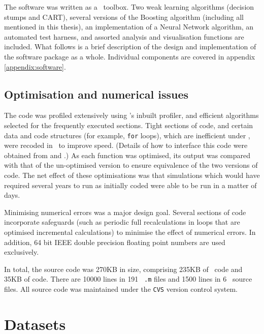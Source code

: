 The software was written as a \MATLAB\ toolbox.  Two weak learning
algorithms (decision stumps and CART), several versions of the
Boosting algorithm (including all mentioned in this thesis), an
implementation of a Neural Network algorithm, an automated test
harness, and assorted analysis and visualisation functions are
included.  What follows is a brief description of the design and
implementation of the software package as a whole.  Individual
components are covered in appendix \ref{appendix:software}.

\subsection{Optimisation and numerical issues}

The code was profiled extensively using \MATLAB's inbuilt profiler,
and efficient algorithms selected for the frequently executed
sections.  Tight sections of code, and certain data and code
structures (for example, {\tt for} loops), which are inefficient under
\MATLAB, were recoded in \C\ to improve speed.  (Details of how
to interface this code were obtained from \cite{MathWorks96} and
\cite{MathWorks96a}.) As each function was optimised, its output was
compared with that of the un-optimised version to ensure equivalence
of the two versions of code.  The net effect of these optimisations
was that simulations which would have required several years to run as
initially coded were able to be run in a matter of days.

Minimising numerical errors was a major design goal.  Several sections
of code incorporate safeguards (such as periodic full recalculations
in loops that are optimised incremental calculations) to minimise the
effect of numerical errors.  In addition, 64 bit IEEE double precision
floating point numbers are used exclusively.

In total, the source code was 270KB in size, comprising 235KB of
\MATLAB\ code and 35KB of \C code.  There are 10000 lines in 191
\MATLAB\ {\tt .m} files and 1500 lines in 6 \C\ source files.  All
source code was maintained under the {\tt CVS} version control
system.

\section{Datasets}

